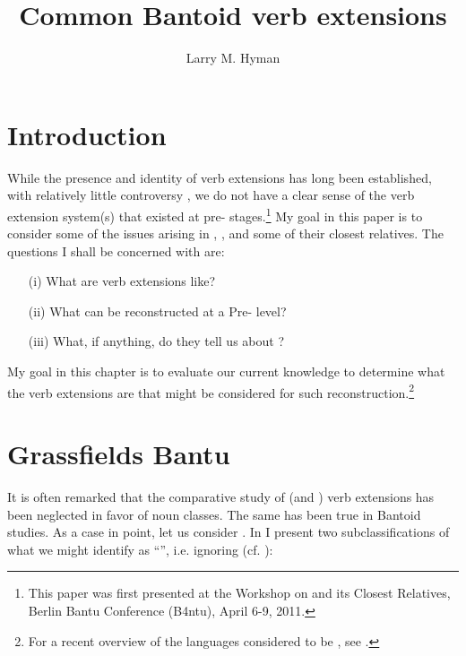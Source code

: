\documentclass[output=paper]{langsci/langscibook}
\author{Larry M. Hyman\affiliation{University of California, Berkeley}}
\title{Common Bantoid verb extensions}
\begin{document}
\label{sec:5}
\section{Introduction}
While the presence and identity of  verb extensions has long been established, with relatively little controversy \citep{Meeussen1967,Schadeberg2003}, we do not have a clear sense of the verb extension system(s) that existed at pre- stages.\footnote{This paper was first presented at the Workshop on  and its Closest Relatives, Berlin Bantu Conference (B4ntu), April 6-9, 2011.} My goal in this paper is to consider some of the issues arising in , , and some of their closest  relatives. The questions I shall be concerned with are: 
\begin{itemize}
\item[(i)]  What are  verb extensions like? 
\item[(ii)] What can be reconstructed at a  Pre- level? 
\item[(iii)] What, if anything, do they tell us about ? 
\end{itemize}

\noindent
My goal in this chapter is to evaluate our current knowledge to determine what the  verb extensions are that might be considered for such reconstruction.\footnote{For a recent overview of the languages considered to be , see \citet{Blench2015}.}

\section{{Grassfields Bantu}}

It is often remarked that the comparative study of  (and ) verb extensions has been neglected in favor of noun classes. The same has been true in Bantoid studies. As a case in point, let us consider . In  I present two subclassifications of what we might identify as “”, i.e. ignoring  (cf. \citealt{Stallcup1980geo,WattersLeroy1989,Piron1995,Watters2003}):
\end{document}
